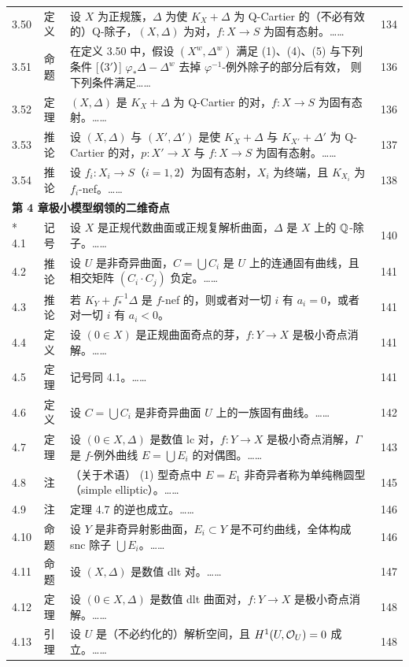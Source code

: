 \begin{longtable}{@{}p{}p{}p{}p{}@{}}
3.50 & 定义 & 设 $X$ 为正规簇，$\Delta$ 为使 $K_X+\Delta$ 为 Q-Cartier 的（不必有效的）Q-除子，$(X,\Delta)$ 为对，$f:X\to S$ 为固有态射。…… & 134 \\
3.51 & 命题 & 在定义 3.50 中，假设 $(X^{w},\Delta^{w})$ 满足 (1)、(4)、(5) 与下列条件 [（$3'$）] $\varphi_*\Delta-\Delta^{w}$ 去掉 $\varphi^{-1}$-例外除子的部分后有效， 则下列条件满足…… & 136 \\
3.52 & 定理 & $(X,\Delta)$ 是 $K_X+\Delta$ 为 Q-Cartier 的对，$f:X\to S$ 为固有态射。…… & 136 \\
3.53 & 推论 & 设 $(X,\Delta)$ 与 $(X',\Delta')$ 是使 $K_X+\Delta$ 与 $K_{X'}+\Delta'$ 为 Q-Cartier 的对，$p:X'\to X$ 与 $f:X\to S$ 为固有态射。…… & 137 \\
3.54 & 推论 & 设 $f_i:X_i\to S$（$i=1,2$）为固有态射，$X_i$ 为终端，且 $K_{X_i}$ 为 $f_i$-nef。…… & 138 \\
\multicolumn{4}{l}{\textbf{第 4 章\quad 极小模型纲领的二维奇点}}\\*
4.1 & 记号 & 设 $X$ 是正规代数曲面或正规复解析曲面，$\Delta$ 是 $X$ 上的 $\mathbb{Q}$-除子。…… & 140 \\
4.2 & 推论 & 设 $U$ 是非奇异曲面，$C=\bigcup C_i$ 是 $U$ 上的连通固有曲线，且相交矩阵 $(C_i\cdot C_j)$ 负定。…… & 141 \\
4.3 & 推论 & 若 $K_Y+f_*^{-1}\Delta$ 是 $f$-nef 的，则或者对一切 $i$ 有 $a_i=0$，或者对一切 $i$ 有 $a_i<0$。 & 141 \\
4.4 & 定义 & 设 $(0\in X)$ 是正规曲面奇点的芽，$f\colon Y\to X$ 是极小奇点消解。…… & 141 \\
4.5 & 定理 & 记号同 4.1。…… & 141 \\
4.6 & 定义 & 设 $C=\bigcup C_i$ 是非奇异曲面 $U$ 上的一族固有曲线。…… & 142 \\
4.7 & 定理 & 设 $(0\in X,\Delta)$ 是数值 lc 对，$f\colon Y\to X$ 是极小奇点消解，$\Gamma$ 是 $f$-例外曲线 $E=\bigcup E_i$ 的对偶图。…… & 143 \\
4.8 & 注 & （关于术语） (1) 型奇点中 $E=E_1$ 非奇异者称为单纯椭圆型（simple elliptic）。…… & 145 \\
4.9 & 注 & 定理 4.7 的逆也成立。…… & 146 \\
4.10 & 命题 & 设 $Y$ 是非奇异射影曲面，$E_i\subset Y$ 是不可约曲线，全体构成 snc 除子 $\bigcup E_i$。…… & 146 \\
4.11 & 命题 & 设 $(X,\Delta)$ 是数值 dlt 对。…… & 147 \\
4.12 & 定理 & 设 $(0\in X,\Delta)$ 是数值 dlt 曲面对，$f\colon Y\to X$ 是极小奇点消解。…… & 148 \\
4.13 & 引理 & 设 $U$ 是（不必约化的）解析空间，且 $H^1(U,\mathcal{O}_U)=0$ 成立。…… & 148 \\

\end{longtable}
